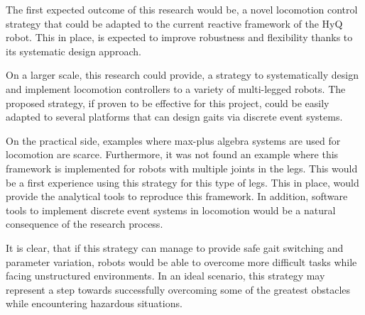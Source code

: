 \documentclass[../main.tex]{subfiles}
\begin{document}
	
	
	The first expected outcome of this research would be, a novel locomotion control strategy that could be adapted to the current reactive framework of the HyQ robot. This in place, is expected to improve robustness and flexibility thanks to its systematic design approach.
	
	On a larger scale, this research could provide, a strategy to systematically design and implement locomotion controllers to a variety of multi-legged robots. The proposed strategy, if proven to be effective for this project, could be easily adapted to several platforms that can design gaits via discrete event systems.  
	
	On the practical side, examples where max-plus algebra systems are used for locomotion are scarce. Furthermore, it was not found an example where this framework is implemented for robots with multiple joints in the legs. This would be a first experience using this strategy for this type of legs. This in place, would provide the analytical tools to reproduce this framework. In addition, software tools to implement discrete event systems in locomotion would be a natural consequence of the research process.
	
	It is clear, that if this strategy can manage to provide safe gait switching and parameter variation, robots would be able to overcome more difficult tasks while facing unstructured environments. In an ideal scenario, this strategy may represent a step towards successfully overcoming some of the greatest obstacles while encountering hazardous situations.  
\end{document}
